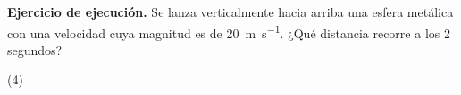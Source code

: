 \documentclass[12pt, letter]{exam}
\begin{document}
\begin{questions}
    \question \label{Ejercicio_05} \textbf{Ejercicio de ejecución. } Se lanza verticalmente hacia arriba una esfera metálica con una velocidad cuya magnitud es de \SI{20}{\meter\per\second}. ¿Qué distancia recorre a los \num{2} segundos?
    \begin{tasks}(4)

\end{tasks}
\end{questions}
\end{document}
